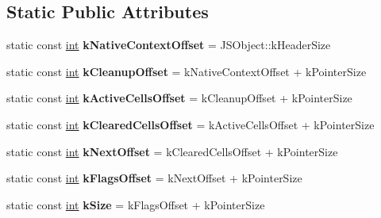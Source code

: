 \subsection*{Static Public Attributes}
\begin{DoxyCompactItemize}
\item 
\mbox{\label{classv8_1_1internal_1_1JSWeakFactory_a41cea40227bcdec771f7bee9852dc240}} 
static const \mbox{\hyperlink{classint}{int}} {\bfseries k\+Native\+Context\+Offset} = J\+S\+Object\+::k\+Header\+Size
\item 
\mbox{\label{classv8_1_1internal_1_1JSWeakFactory_a990004d17e70977a3f6a312e0378c598}} 
static const \mbox{\hyperlink{classint}{int}} {\bfseries k\+Cleanup\+Offset} = k\+Native\+Context\+Offset + k\+Pointer\+Size
\item 
\mbox{\label{classv8_1_1internal_1_1JSWeakFactory_a3077f0cd7c4608a06cdaace17cbc6f47}} 
static const \mbox{\hyperlink{classint}{int}} {\bfseries k\+Active\+Cells\+Offset} = k\+Cleanup\+Offset + k\+Pointer\+Size
\item 
\mbox{\label{classv8_1_1internal_1_1JSWeakFactory_a9da19b5b9d37a10d38d935d65c731547}} 
static const \mbox{\hyperlink{classint}{int}} {\bfseries k\+Cleared\+Cells\+Offset} = k\+Active\+Cells\+Offset + k\+Pointer\+Size
\item 
\mbox{\label{classv8_1_1internal_1_1JSWeakFactory_a88be08c7f3d890603be2c72067caa7f4}} 
static const \mbox{\hyperlink{classint}{int}} {\bfseries k\+Next\+Offset} = k\+Cleared\+Cells\+Offset + k\+Pointer\+Size
\item 
\mbox{\label{classv8_1_1internal_1_1JSWeakFactory_a4ac559e0461c73c81e7e04ce07abbe04}} 
static const \mbox{\hyperlink{classint}{int}} {\bfseries k\+Flags\+Offset} = k\+Next\+Offset + k\+Pointer\+Size
\item 
\mbox{\label{classv8_1_1internal_1_1JSWeakFactory_a223d0c0d733ac252157a458c551be13f}} 
static const \mbox{\hyperlink{classint}{int}} {\bfseries k\+Size} = k\+Flags\+Offset + k\+Pointer\+Size
\end{DoxyCompactItemize}
